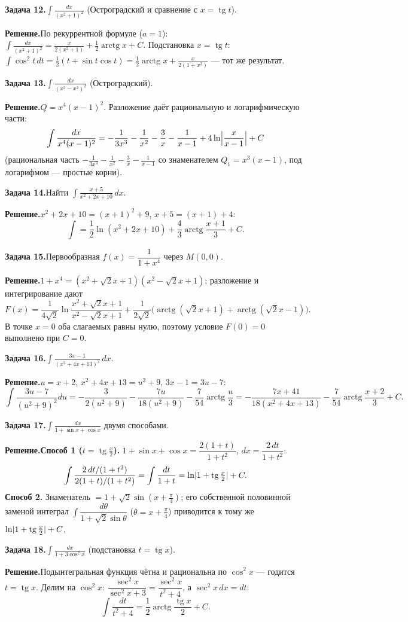 \documentclass[10pt,a4paper]{article}
\DeclareMathOperator{\tg}{tg}
\DeclareMathOperator{\arctg}{arctg}
\newcommand{\dx}{\,dx}
\newcommand{\dt}{\,dt}
\DeclarePairedDelimiter{\abs}{\lvert}{\rvert}
\theoremstyle{definition}
\theoremstyle{plain}
\newcommand{\writespace}{\vspace{7.5mm}}
\newcommand{\task}[2]{%
  \par\writespace\noindent
  \textbf{\textcolor{accent}{Задача #1.}}\enspace #2\par\smallskip}
\newcommand{\sol}{\par\noindent\textbf{Решение.}\enspace}
\begin{document}
\task{12}{$\displaystyle\int\frac{dx}{(x^2+1)^2}$ (Остроградский и сравнение с $x=\tg t$).}
\sol По рекуррентной формуле ($a=1$): $\displaystyle\int\frac{dx}{(x^2+1)^2}=\frac{x}{2(x^2+1)}
+\frac12\arctg x+C$. Подстановка $x=\tg t$: $\int\cos^2t\dt=\tfrac12(t+\sin t\cos t)
=\tfrac12\arctg x+\tfrac{x}{2(1+x^2)}$ — тот же результат.

\task{13}{$\displaystyle\int\frac{dx}{(x^3-x^2)^2}$ (Остроградский).}
\sol $Q=x^4(x-1)^2$. Разложение даёт рациональную и логарифмическую части:
\[
  \int\frac{dx}{x^4(x-1)^2}=-\frac{1}{3x^3}-\frac1{x^2}-\frac3x-\frac1{x-1}
   +4\ln\abs[\Big]{\frac{x}{x-1}}+C
\]
(рациональная часть $-\tfrac1{3x^3}-\tfrac1{x^2}-\tfrac3x-\tfrac1{x-1}$ со знаменателем
$Q_1=x^3(x-1)$, под логарифмом — простые корни).

\task{14}{Найти $\displaystyle\int\frac{x+5}{x^2+2x+10}\dx$.}
\sol $x^2+2x+10=(x+1)^2+9$, $x+5=(x+1)+4$:
\[
  \int=\frac12\ln(x^2+2x+10)+\frac43\arctg\frac{x+1}{3}+C.
\]

\task{15}{Первообразная $f(x)=\dfrac1{1+x^4}$ через $M(0,0)$.}
\sol $1+x^4=(x^2+\sqrt2x+1)(x^2-\sqrt2x+1)$; разложение и интегрирование дают
\[
  F(x)=\frac1{4\sqrt2}\ln\frac{x^2+\sqrt2x+1}{x^2-\sqrt2x+1}
   +\frac1{2\sqrt2}\bigl(\arctg(\sqrt2x+1)+\arctg(\sqrt2x-1)\bigr).
\]
В точке $x=0$ оба слагаемых равны нулю, поэтому условие $F(0)=0$ выполнено при $C=0$.

\task{16}{$\displaystyle\int\frac{3x-1}{(x^2+4x+13)^2}\dx$.}
\sol $u=x+2$, $x^2+4x+13=u^2+9$, $3x-1=3u-7$:
\[
  \int\frac{3u-7}{(u^2+9)^2}du=-\frac{3}{2(u^2+9)}-\frac{7u}{18(u^2+9)}-\frac7{54}\arctg\frac u3
  =-\frac{7x+41}{18(x^2+4x+13)}-\frac{7}{54}\arctg\frac{x+2}{3}+C.
\]

\task{17}{$\displaystyle\int\frac{dx}{1+\sin x+\cos x}$ двумя способами.}
\sol \textbf{Способ 1 ($t=\tg\tfrac x2$).} $1+\sin x+\cos x=\dfrac{2(1+t)}{1+t^2}$, $dx=\dfrac{2\,dt}{1+t^2}$:
\[
  \int\frac{2\,dt/(1+t^2)}{2(1+t)/(1+t^2)}=\int\frac{dt}{1+t}=\ln\abs{1+\tg\tfrac x2}+C.
\]
\textbf{Способ 2.} Знаменатель $=1+\sqrt2\sin(x+\tfrac\pi4)$; его собственной половинной заменой
интеграл $\int\dfrac{d\theta}{1+\sqrt2\sin\theta}$ ($\theta=x+\tfrac\pi4$) приводится к тому же
$\ln\abs{1+\tg\tfrac x2}+C$.

\task{18}{$\displaystyle\int\frac{dx}{1+3\cos^2x}$ (подстановка $t=\tg x$).}
\sol Подынтегральная функция чётна и рациональна по $\cos^2x$ — годится $t=\tg x$. Делим на
$\cos^2x$: $\dfrac{\sec^2x}{\sec^2x+3}=\dfrac{\sec^2x}{t^2+4}$, а $\sec^2x\dx=dt$:
\[
  \int\frac{dt}{t^2+4}=\frac12\arctg\frac{\tg x}{2}+C.
\]
\end{document}
